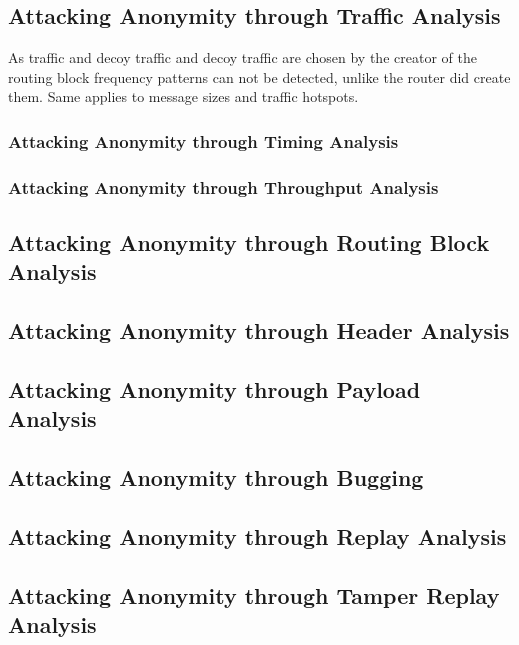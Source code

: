 \subsection{Attacking Anonymity through Traffic Analysis}
As traffic and decoy traffic and decoy traffic are chosen by the creator of the routing block frequency patterns can not be detected, unlike the router did create them. Same applies to message sizes and traffic hotspots. 

\subsubsection{Attacking Anonymity through Timing Analysis}

\subsubsection{Attacking Anonymity through Throughput Analysis}

\subsection{Attacking Anonymity through Routing Block Analysis}

\subsection{Attacking Anonymity through Header Analysis}

\subsection{Attacking Anonymity through Payload Analysis}

\subsection{Attacking Anonymity through Bugging}

\subsection{Attacking Anonymity through Replay Analysis}

\subsection{Attacking Anonymity through Tamper Replay Analysis}

